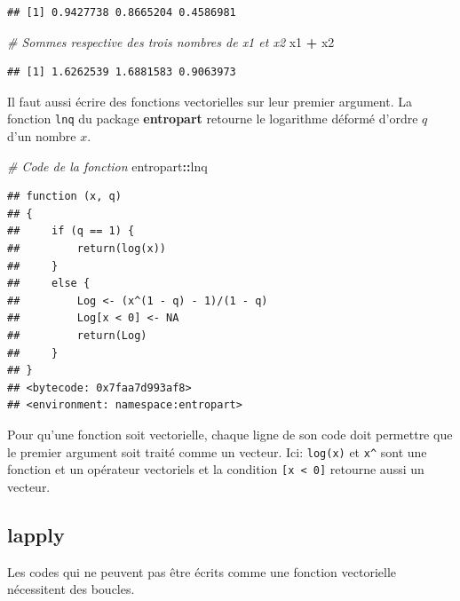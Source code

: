 \documentclass[
  12pt,
  french,
  a4paper,
  extrafontsizes,onecolumn,openright
  ]{memoir}
\newenvironment{Shaded}{\begin{snugshade}}{\end{snugshade}}
\newcommand{\CommentTok}[1]{\textcolor[rgb]{0.56,0.35,0.01}{\textit{#1}}}
\newcommand{\NormalTok}[1]{#1}
\newcommand{\OperatorTok}[1]{\textcolor[rgb]{0.81,0.36,0.00}{\textbf{#1}}}
\newcommand{\StringTok}[1]{\textcolor[rgb]{0.31,0.60,0.02}{#1}}
\begin{document}
\begin{verbatim}
## [1] 0.9427738 0.8665204 0.4586981
\end{verbatim}

\begin{Shaded}
\begin{Highlighting}[]
\CommentTok{# Sommes respective des trois nombres de x1 et x2}
\NormalTok{x1 }\OperatorTok{+}\StringTok{ }\NormalTok{x2}
\end{Highlighting}
\end{Shaded}

\begin{verbatim}
## [1] 1.6262539 1.6881583 0.9063973
\end{verbatim}

\normalsize

Il faut aussi écrire des fonctions vectorielles sur leur premier argument.
La fonction \texttt{lnq} du package \textbf{entropart} retourne le logarithme déformé d'ordre \(q\) d'un nombre \(x\).

\scriptsize

\begin{Shaded}
\begin{Highlighting}[]
\CommentTok{# Code de la fonction}
\NormalTok{entropart}\OperatorTok{::}\NormalTok{lnq}
\end{Highlighting}
\end{Shaded}

\begin{verbatim}
## function (x, q) 
## {
##     if (q == 1) {
##         return(log(x))
##     }
##     else {
##         Log <- (x^(1 - q) - 1)/(1 - q)
##         Log[x < 0] <- NA
##         return(Log)
##     }
## }
## <bytecode: 0x7faa7d993af8>
## <environment: namespace:entropart>
\end{verbatim}

\normalsize

Pour qu'une fonction soit vectorielle, chaque ligne de son code doit permettre que le premier argument soit traité comme un vecteur.
Ici: \texttt{log(x)} et \texttt{x\^{}} sont une fonction et un opérateur vectoriels et la condition \texttt{{[}x\ \textless{}\ 0{]}} retourne aussi un vecteur.

\hypertarget{lapply}{%
\subsection{lapply}\label{lapply}}

Les codes qui ne peuvent pas être écrits comme une fonction vectorielle nécessitent des boucles.
\end{document}
